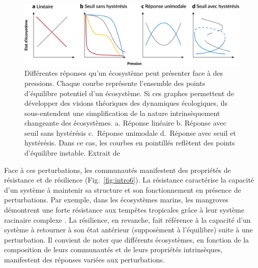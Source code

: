 \begin{refsection}
\begin{figure}
\hypertarget{fig:intro5}{%
\centering
\includegraphics{02-Introduction/figures/ecosystem_responses.png}
\caption[Différentes réponses qu'un écosystème peut présenter face à des
pressions.]{Différentes réponses qu'un écosystème peut présenter face à des
pressions. Chaque courbe représente l'ensemble des points d'équilibre
potentiel d'un écosystème. Si ces graphes permettent de développer des
visions théoriques des dynamiques écologiques, ils sous-entendent une
simplification de la nature intrinsèquement changeante des écosystèmes.
a. Réponse linéaire b. Réponse avec seuil sans hystérésis c.~Réponse
unimodale d.~Réponse avec seuil et hystérésis. Dans ce cas, les courbes
en pointillés reflètent des points d'équilibre instable. Extrait de
\textcite{Spake_2022}}\label{fig:intro5}
}
\end{figure}

Face à ces perturbations, les communautés manifestent des propriétés de
résistance et de résilience (Fig.~\ref{fig:intro6}). La résistance
caractérise la capacité d'un système à maintenir sa structure et son
fonctionnement en présence de perturbations. Par exemple, dans les
écosystèmes marins, les mangroves démontrent une forte résistance aux
tempêtes tropicales grâce à leur système racinaire complexe
\autocite{Kazemi_2018}. La résilience, en revanche, fait référence à la
capacité d'un système à retourner à son état antérieur (supposément à
l'équilibre) suite à une perturbation. Il convient de noter que
différents écosystèmes, en fonction de la composition de leurs
communautés et de leurs propriétés intrinsèques, manifestent des
réponses variées aux perturbations.


\end{refsection}
